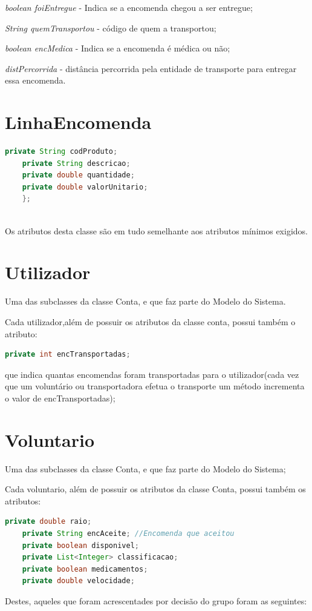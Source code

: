 \documentclass[a4paper]{report}
\begin{document}
	  \textit{boolean foiEntregue}  - Indica se a encomenda chegou a ser entregue;
	  
	  \textit{String quemTransportou} - código de quem a transportou;
	  
	  \textit{boolean encMedica} - Indica se a encomenda é médica ou não;
	  
	  \textit{distPercorrida} - distância percorrida pela entidade de transporte para entregar essa encomenda.
	  
	
		\section{LinhaEncomenda}
	\begin{lstlisting}[language=Java]
	private String codProduto;
	private String descricao;
	private double quantidade;
	private double valorUnitario;
	};
	
	\end{lstlisting}
		Os atributos desta classe são em tudo semelhante aos atributos mínimos exigidos.
		
	\section{Utilizador}
	Uma das subclasses da classe Conta, e que faz parte do Modelo do Sistema.	
	
	Cada utilizador,além de possuir os atributos da classe conta, possui também o atributo:
	\begin{lstlisting}[language=Java]
	private int encTransportadas;
	\end{lstlisting}
	que indica quantas encomendas foram transportadas para o utilizador(cada vez que um voluntário ou transportadora efetua o transporte um método incrementa o valor de encTransportadas);
	
	
	\section{Voluntario}
	Uma das subclasses da classe Conta, e que faz parte do Modelo do Sistema;
	
	Cada voluntario, além de possuir os atributos da classe Conta, possui também os atributos:
	\begin{lstlisting}[language=Java]
	private double raio;
	private String encAceite; //Encomenda que aceitou
	private boolean disponivel;
	private List<Integer> classificacao;
	private boolean medicamentos;
	private double velocidade; 
	\end{lstlisting}
	Destes, aqueles que foram acrescentades por decisão do grupo foram as seguintes:
 	
\end{document}
